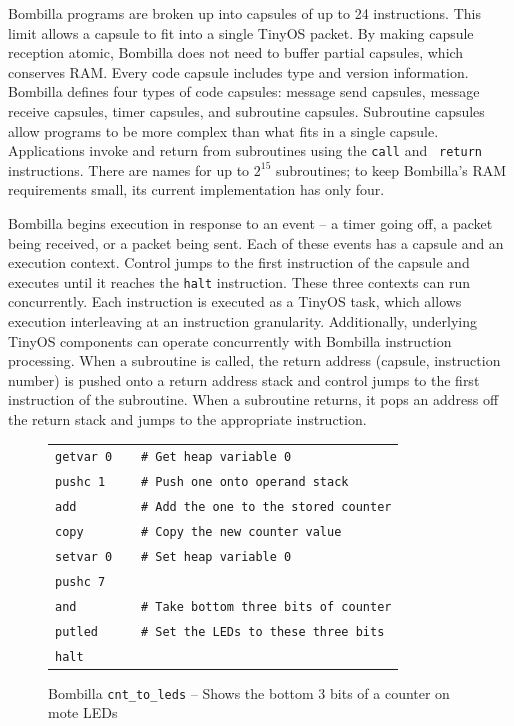 \documentclass[10pt]{article}
\begin{document}
Bombilla programs are broken up into capsules of up to 24
instructions. This limit allows a capsule to fit into a single TinyOS
packet. By making capsule reception atomic, Bombilla does not need to
buffer partial capsules, which conserves RAM. Every code capsule
includes type and version information. Bombilla defines four types of
code capsules: message send capsules, message receive capsules, timer
capsules, and subroutine capsules. Subroutine capsules allow programs
to be more complex than what fits in a single capsule. Applications
invoke and return from subroutines using the {\tt call} and {\tt
return} instructions. There are names for up to $2^{15}$ subroutines;
to keep Bombilla's RAM requirements small, its current implementation
has only four.

Bombilla begins execution in response to an event -- a timer going
off, a packet being received, or a packet being sent. Each of these
events has a capsule and an execution context. Control jumps to the
first instruction of the capsule and executes until it reaches the
{\tt halt} instruction. These three contexts can run
concurrently. Each instruction is executed as a TinyOS task, which
allows execution interleaving at an instruction
granularity. Additionally, underlying TinyOS components can operate
concurrently with Bombilla instruction processing. When a subroutine is
called, the return address (capsule, instruction number) is pushed
onto a return address stack and control jumps to the first instruction
of the subroutine. When a subroutine returns, it pops an address off
the return stack and jumps to the appropriate instruction.

\begin{figure}
\begin{center}
\scriptsize
\begin{tabular}{l}
\verb;getvar 0    # Get heap variable 0;\\
\verb;pushc 1     # Push one onto operand stack;\\
\verb;add         # Add the one to the stored counter;\\     
\verb;copy        # Copy the new counter value;\\
\verb;setvar 0    # Set heap variable 0;\\
\verb;pushc 7 ;\\     
\verb;and         # Take bottom three bits of counter;\\
\verb;putled      # Set the LEDs to these three bits;\\
\verb;halt;\\
\end{tabular}
\normalsize

\caption{Bombilla {\tt cnt\_to\_leds} -- Shows the bottom 3 bits of a counter on mote LEDs}
\label{fig:cnt}
\end{center}
\end{figure}
\end{document}
